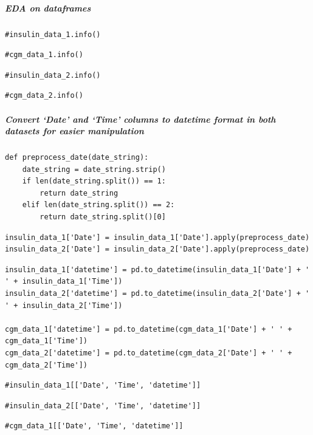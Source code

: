 \subparagraph{EDA on dataframes}

\begin{verbatim}
#insulin_data_1.info()
\end{verbatim}

\begin{verbatim}
#cgm_data_1.info()
\end{verbatim}

\begin{verbatim}
#insulin_data_2.info()
\end{verbatim}

\begin{verbatim}
#cgm_data_2.info()
\end{verbatim}

\subparagraph{Convert `Date' and `Time' columns to datetime format in both datasets for easier manipulation}

\begin{verbatim}
def preprocess_date(date_string):
    date_string = date_string.strip()
    if len(date_string.split()) == 1:
        return date_string
    elif len(date_string.split()) == 2:
        return date_string.split()[0]
\end{verbatim}

\begin{verbatim}
insulin_data_1['Date'] = insulin_data_1['Date'].apply(preprocess_date)
insulin_data_2['Date'] = insulin_data_2['Date'].apply(preprocess_date)
\end{verbatim}

\begin{verbatim}
insulin_data_1['datetime'] = pd.to_datetime(insulin_data_1['Date'] + ' ' + insulin_data_1['Time'])
insulin_data_2['datetime'] = pd.to_datetime(insulin_data_2['Date'] + ' ' + insulin_data_2['Time'])

cgm_data_1['datetime'] = pd.to_datetime(cgm_data_1['Date'] + ' ' + cgm_data_1['Time'])
cgm_data_2['datetime'] = pd.to_datetime(cgm_data_2['Date'] + ' ' + cgm_data_2['Time'])
\end{verbatim}

\begin{verbatim}
#insulin_data_1[['Date', 'Time', 'datetime']]
\end{verbatim}

\begin{verbatim}
#insulin_data_2[['Date', 'Time', 'datetime']]
\end{verbatim}

\begin{verbatim}
#cgm_data_1[['Date', 'Time', 'datetime']]
\end{verbatim}

